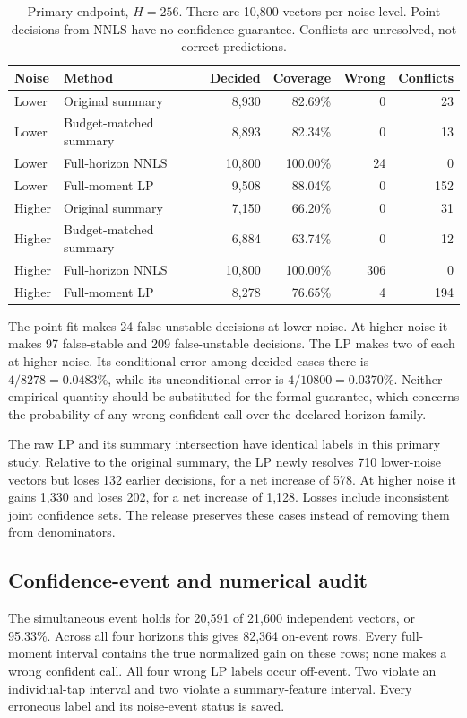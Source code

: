\documentclass[11pt]{article}
\theoremstyle{remark}\newtheorem{remark}[proposition]{Remark}
\begin{document}
\begin{table}[htbp]\centering\small
\caption{Primary endpoint, $H=256$. There are 10,800 vectors per noise level. Point decisions from NNLS have no confidence guarantee. Conflicts are unresolved, not correct predictions.}\label{tab:primary}
\begin{tabular}{llrrrr}\toprule
Noise&Method&Decided&Coverage&Wrong&Conflicts\\\midrule
Lower&Original summary&8,930&82.69\%&0&23\\
Lower&Budget-matched summary&8,893&82.34\%&0&13\\
Lower&Full-horizon NNLS&10,800&100.00\%&24&0\\
Lower&Full-moment LP&9,508&88.04\%&0&152\\\midrule
Higher&Original summary&7,150&66.20\%&0&31\\
Higher&Budget-matched summary&6,884&63.74\%&0&12\\
Higher&Full-horizon NNLS&10,800&100.00\%&306&0\\
Higher&Full-moment LP&8,278&76.65\%&4&194\\\bottomrule
\end{tabular}
\end{table}

The point fit makes 24 false-unstable decisions at lower noise. At higher noise it makes 97 false-stable and 209 false-unstable decisions. The LP makes two of each at higher noise. Its conditional error among decided cases there is $4/8278=0.0483\%$, while its unconditional error is $4/10800=0.0370\%$. Neither empirical quantity should be substituted for the formal guarantee, which concerns the probability of any wrong confident call over the declared horizon family.

The raw LP and its summary intersection have identical labels in this primary study. Relative to the original summary, the LP newly resolves 710 lower-noise vectors but loses 132 earlier decisions, for a net increase of 578. At higher noise it gains 1,330 and loses 202, for a net increase of 1,128. Losses include inconsistent joint confidence sets. The release preserves these cases instead of removing them from denominators.

\subsection{Confidence-event and numerical audit}
The simultaneous event holds for 20,591 of 21,600 independent vectors, or 95.33\%. Across all four horizons this gives 82,364 on-event rows. Every full-moment interval contains the true normalized gain on these rows; none makes a wrong confident call. All four wrong LP labels occur off-event. Two violate an individual-tap interval and two violate a summary-feature interval. Every erroneous label and its noise-event status is saved.
\end{document}

